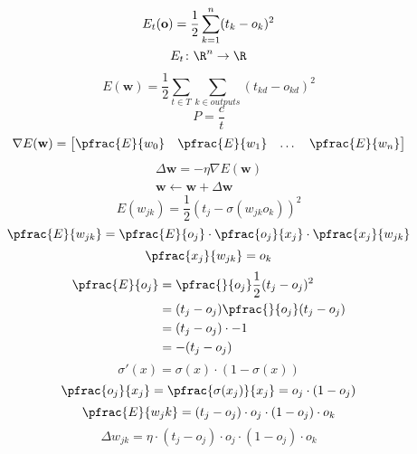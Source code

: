 \documentclass[../SOP.tex]{subfile}
\begin{document}
\begin{gather}
  E_t(\mathbf{o})=\frac{1}{2}\sum_{k=1}^n(t_k-o_k)^2 \label{eq:cost}\\
  E_t\colon \R^n\rightarrow\R\nonumber
\end{gather}
\begin{equation}
  E(\mathbf{w})=\frac{1}{2}\sum_{t\in T}\sum_{k\in outputs}(t_{kd}-o_{kd})^2
  \label{eq:costset}
\end{equation}
\begin{equation*}
  P=\frac{c}{t}
\end{equation*}
\begin{equation}
  \nabla E(\mathbf{w})=\begin{bmatrix}
    \pfrac{E}{w_0} & \pfrac{E}{w_1} & \dots & \pfrac{E}{w_n}
  \end{bmatrix}
  \label{eq:gradError}
\end{equation}
\begin{gather}
  \Delta \mathbf{w} = -\eta \nabla E(\mathbf{w}) \label{eq:trgrad}\\ 
  \mathbf{w} \leftarrow \mathbf{w} + \Delta\mathbf{w}
\end{gather}
\begin{equation*}
  E(w_{jk})=\frac{1}{2}(t_j-\sigma(w_{jk}o_k))^2
\end{equation*}
\begin{equation*}
  \pfrac{E}{w_{jk}}=\pfrac{E}{o_j}\cdot\pfrac{o_j}{x_j}\cdot\pfrac{x_j}{w_{jk}}
\end{equation*}
\begin{equation*}
  \pfrac{x_j}{w_{jk}}=o_k
\end{equation*}
\begin{align*}
  \pfrac{E}{o_j}&=\pfrac{}{o_j}\frac{1}{2}(t_j-o_j)^2\\
  &= (t_j-o_j)\pfrac{}{o_j}(t_j-o_j)\\
  &= (t_j-o_j)\cdot-1\\
  &= -(t_j-o_j)
\end{align*}
\begin{equation*}
  \sigma'(x)=\sigma(x)\cdot(1-\sigma(x))
\end{equation*}
\begin{equation*}
  \pfrac{o_j}{x_j}=\pfrac{\sigma(x_j)}{x_j}=o_j\cdot(1-o_j)
\end{equation*}
\begin{equation}
  \pfrac{E}{w_jk}=(t_j-o_j)\cdot o_j \cdot (1-o_j)\cdot o_k
  \label{eq:errorWeight}
\end{equation}
\begin{equation}
  \Delta w_{jk}=\eta\cdot (t_j-o_j)\cdot o_j\cdot(1-o_j)\cdot o_k
  \label{eq:trOutput}
\end{equation}
\end{document}

